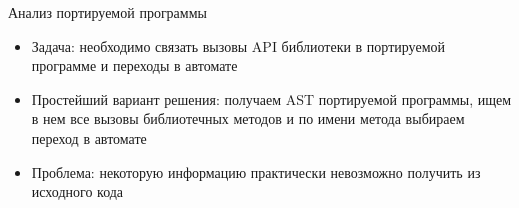 \documentclass[12pt]{beamer}
\begin{document}
{
\begin{frame}{Анализ портируемой программы}
  \begin{mybox}[]
  \begin{itemize}
  	\item Задача: необходимо связать вызовы API библиотеки в портируемой программе и переходы в автомате
  	\item Простейший вариант решения: получаем AST портируемой программы, ищем в нем все вызовы библиотечных методов и по имени метода выбираем переход в автомате
  	\item Проблема: некоторую информацию практически невозможно получить из исходного кода
  \end{itemize}
  \end{mybox}
\end{frame}
}
\end{document}
